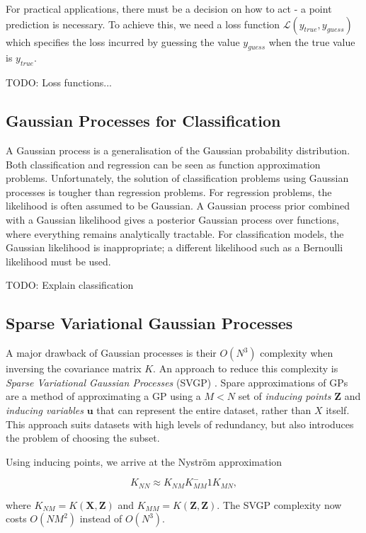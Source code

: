 \documentclass[12pt,a4paper]{report}
\theoremstyle{definition}
\begin{document}
For practical applications, there must be a decision on how to act - a point prediction is necessary. 
To achieve this, we need a loss function $\mathcal{L}(y_{true}, y_{guess})$ which specifies the loss incurred by guessing the value $y_{guess}$ when the true value is $y_{true}$. 

TODO: Loss functions...

\subsection{Gaussian Processes for Classification}

A Gaussian process is a generalisation of the Gaussian probability distribution. 
Both classification and regression can be seen as function approximation problems. 
Unfortunately, the solution of classification problems using Gaussian processes is tougher than regression problems. 
For regression problems, the likelihood is often assumed to be Gaussian. 
A Gaussian process prior combined with a Gaussian likelihood gives a posterior Gaussian process over functions, where everything remains analytically tractable. 
For classification models, the Gaussian likelihood is inappropriate; a different likelihood such as a Bernoulli likelihood must be used.

TODO: Explain classification

\subsection{Sparse Variational Gaussian Processes}

A major drawback of Gaussian processes is their $O(N^3)$ complexity when inversing the covariance matrix $K$.
An approach to reduce this complexity is \emph{Sparse Variational Gaussian Processes} (SVGP) \citep{Hensman2014}.
Spare approximations of GPs are a method of approximating a GP using a $M < N$ set of \emph{inducing points} $\textbf{Z}$ and \emph{inducing variables} $\textbf{u}$ that can represent the entire dataset, rather than $X$ itself. 
This approach suits datasets with high levels of redundancy, but also introduces the problem of choosing the subset.

Using inducing points, we arrive at the Nystr{\"o}m approximation

\begin{equation}
	K_{NN} \approx K_{NM} K_{MM}^-1 K_{MN},
\end{equation}

where $K_{NM} = K(\textbf{X}, \textbf{Z})$ and $K_{MM} = K(\textbf{Z}, \textbf{Z})$.
The SVGP complexity now costs $O(NM^2)$ instead of $O(N^3)$.
\end{document}
